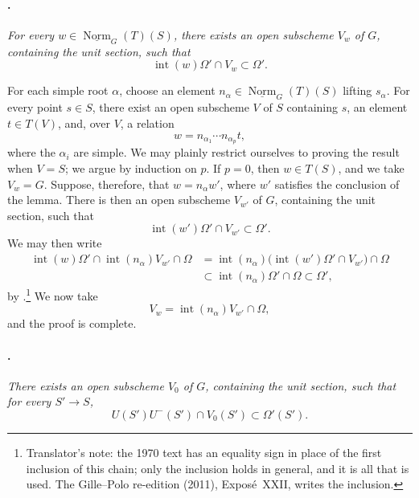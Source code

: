 \paragraph{.}
{\itshape For every
\(w\in\underline{\operatorname{Norm}}_G(T)(S)\), there exists an
open subscheme \(V_w\) of \(G\), containing the unit section, such
that
\[
  \operatorname{int}(w)\Omega'\cap V_w\subset\Omega'.
\]}

For each simple root \(\alpha\), choose an element
\(n_\alpha\in\underline{\operatorname{Norm}}_G(T)(S)\) lifting
\(s_\alpha\). For every point \(s\in S\), there exist an open
subscheme \(V\) of \(S\) containing \(s\), an element \(t\in T(V)\),
and, over \(V\), a relation
\[
  w=n_{\alpha_1}\cdots n_{\alpha_p}t,
\]
where the \(\alpha_i\) are simple. We may plainly restrict ourselves
to proving the result when \(V=S\); we argue by induction on \(p\).
If \(p=0\), then \(w\in T(S)\), and we take \(V_w=G\). Suppose,
therefore, that \(w=n_\alpha w'\), where \(w'\) satisfies the
conclusion of the lemma. There is then an open subscheme \(V_{w'}\)
of \(G\), containing the unit section, such that
\[
  \operatorname{int}(w')\Omega'\cap V_{w'}\subset\Omega'.
\]
We may then write
\[
\begin{aligned}
  \operatorname{int}(w)\Omega'
    \cap\operatorname{int}(n_\alpha)V_{w'}\cap\Omega
  &=
  \operatorname{int}(n_\alpha)
  \bigl(\operatorname{int}(w')\Omega'\cap V_{w'}\bigr)\cap\Omega\\
  &\subset
  \operatorname{int}(n_\alpha)\Omega'\cap\Omega
  \subset\Omega',
\end{aligned}
\]
by .\footnote{Translator's note: the 1970 text has an equality sign in
place of the first inclusion of this chain; only the inclusion holds in
general, and it is all that is used. The Gille--Polo re-edition (2011),
Exposé~XXII, writes the inclusion.} We now take
\[
  V_w=\operatorname{int}(n_\alpha)V_{w'}\cap\Omega,
\]
and the proof is complete.

\paragraph{.}
{\itshape There exists an open subscheme \(V_0\) of \(G\),
containing the unit section, such that for every \(S'\to S\),
\[
  U(S')U^-(S')\cap V_0(S')\subset\Omega'(S').
\]}

